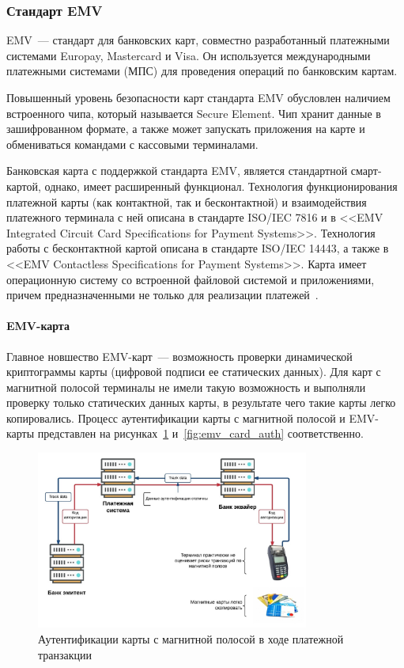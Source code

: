 \subsubsection{Стандарт EMV}

EMV~--- стандарт для банковских карт, совместно разработанный платежными системами Europay, Mastercard и Visa.
Он используется  международными платежными системами (МПС) для проведения операций по банковским картам.

Повышенный уровень безопасности карт стандарта EMV обусловлен наличием встроенного чипа, который называется Secure Element.
Чип хранит данные в зашифрованном формате, а также может запускать приложения на карте и обмениваться командами с кассовыми терминалами.

Банковская карта с поддержкой стандарта EMV, является стандартной смарт-картой, однако, имеет расширенный функционал.
Технология функционирования платежной карты (как контактной, так и бесконтактной) и взаимодействия платежного терминала с ней описана в стандарте ISO/IEC 7816 и в <<EMV Integrated Circuit Card Specifications for Payment Systems>>.
Технология работы с бесконтактной картой описана в стандарте ISO/IEC 14443, а также в <<EMV Contactless Specifications for Payment Systems>>.
Карта имеет операционную систему со встроенной файловой системой и приложениями, причем предназначенными не только для реализации платежей~\cite{emv_specifications_book}.

\paragraph{EMV-карта}

Главное новшество EMV-карт~--- возможность проверки динамической криптограммы карты (цифровой подписи ее статических данных).
Для карт с магнитной полосой терминалы не имели такую возможность и выполняли проверку только статических данных карты, в результате чего такие карты легко копировались.
Процесс аутентификации карты с магнитной полосой и EMV-карты представлен на рисунках~\ref{fig:magnetic_card_auth} и~\ref{fig:emv_card_auth} соответственно.

\begin{figure}[H]
    \centering
    \includegraphics[width=0.8\textwidth]{images/research/magnetic_card_auth}
    \caption{\centering Аутентификации карты с магнитной полосой в ходе платежной транзакции}
    \label{fig:magnetic_card_auth}
\end{figure}

